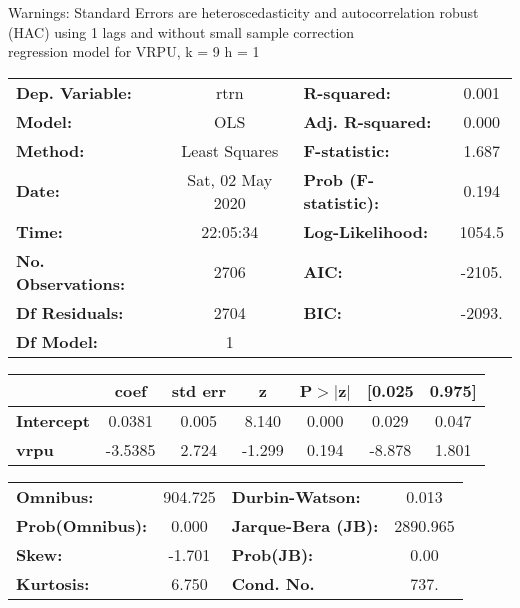 Warnings: \newline
 [1] Standard Errors are heteroscedasticity and autocorrelation robust (HAC) using 1 lags and without small sample correction\\ 

regression model for VRPU, k = 9 h = 1\begin{center}
\begin{tabular}{lclc}
\toprule
\textbf{Dep. Variable:}    &       rtrn       & \textbf{  R-squared:         } &     0.001   \\
\textbf{Model:}            &       OLS        & \textbf{  Adj. R-squared:    } &     0.000   \\
\textbf{Method:}           &  Least Squares   & \textbf{  F-statistic:       } &     1.687   \\
\textbf{Date:}             & Sat, 02 May 2020 & \textbf{  Prob (F-statistic):} &    0.194    \\
\textbf{Time:}             &     22:05:34     & \textbf{  Log-Likelihood:    } &    1054.5   \\
\textbf{No. Observations:} &        2706      & \textbf{  AIC:               } &    -2105.   \\
\textbf{Df Residuals:}     &        2704      & \textbf{  BIC:               } &    -2093.   \\
\textbf{Df Model:}         &           1      & \textbf{                     } &             \\
\bottomrule
\end{tabular}
\begin{tabular}{lcccccc}
                   & \textbf{coef} & \textbf{std err} & \textbf{z} & \textbf{P$> |$z$|$} & \textbf{[0.025} & \textbf{0.975]}  \\
\midrule
\textbf{Intercept} &       0.0381  &        0.005     &     8.140  &         0.000        &        0.029    &        0.047     \\
\textbf{vrpu}      &      -3.5385  &        2.724     &    -1.299  &         0.194        &       -8.878    &        1.801     \\
\bottomrule
\end{tabular}
\begin{tabular}{lclc}
\textbf{Omnibus:}       & 904.725 & \textbf{  Durbin-Watson:     } &    0.013  \\
\textbf{Prob(Omnibus):} &   0.000 & \textbf{  Jarque-Bera (JB):  } & 2890.965  \\
\textbf{Skew:}          &  -1.701 & \textbf{  Prob(JB):          } &     0.00  \\
\textbf{Kurtosis:}      &   6.750 & \textbf{  Cond. No.          } &     737.  \\
\bottomrule
\end{tabular}
\end{center}

